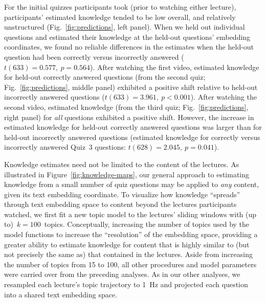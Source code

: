 \documentclass[10pt]{article}
\begin{document}
For the initial quizzes participants took (prior to watching either lecture),
participants' estimated knowledge tended to be low overall, and relatively
unstructured (Fig.~\ref{fig:predictions}, left panel). When we held out
individual questions and estimated their knowledge at the held-out questions'
embedding coordinates, we found no reliable differences in the estimates when
the held-out question had been correctly versus incorrectly answered ($t(633) =
0.577,~p = 0.564$). After watching the first video, estimated knowledge for
held-out correctly answered questions (from the second quiz;
Fig.~\ref{fig:predictions}, middle panel) exhibited a positive shift relative
to held-out incorrectly answered questions ($t(633) = 3.961,~p < 0.001$). After
watching the second video, estimated knowledge (from the third quiz;
Fig.~\ref{fig:predictions}, right panel) for \textit{all} questions exhibited a
positive shift. However, the increase in estimated knowledge for held-out
correctly answered questions was larger than for held-out incorrectly answered
questions (estimated knowledge for correctly versus incorrectly answered
Quiz~3 questions: $t(628) = 2.045,~p = 0.041$).

Knowledge estimates need not be limited to the content of the lectures. As
illustrated in Figure~\ref{fig:knowledge-maps}, our general approach to
estimating knowledge from a small number of quiz questions may be applied to
\textit{any} content, given its text embedding coordinate. To visualize how
knowledge ``spreads'' through text embedding space to content beyond the
lectures participants watched, we first fit a new topic model to the lectures'
sliding windows with (up to)~$k = 100$~topics.
Conceptually, increasing the number of topics used by the model functions to
increase the ``resolution'' of the embedding space, providing a greater ability to
estimate knowledge for content that is highly similar to (but not precisely the same as)
that contained in the lectures.
Aside from increasing the number of topics from 15 to 100, all other
procedures and model parameters were carried over from the preceding analyses.
As in our other analyses, we resampled each lecture's topic trajectory to 1~Hz
and projected each question into a shared text embedding space.
\end{document}
